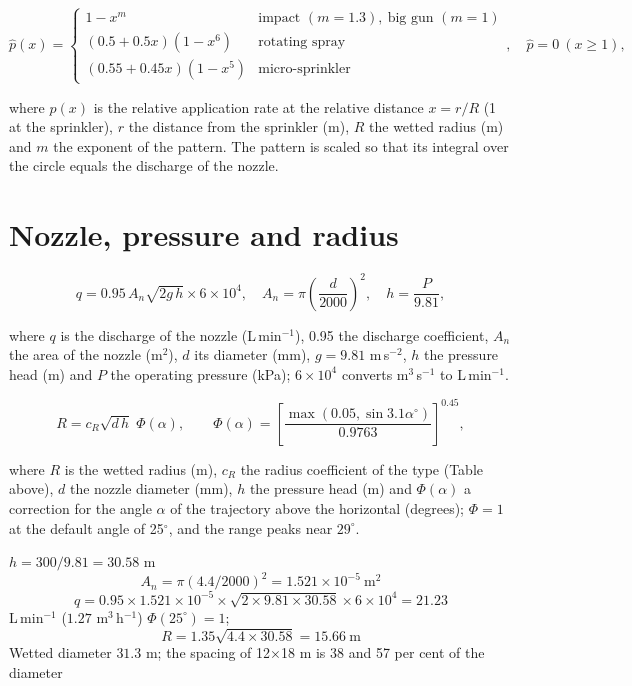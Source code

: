 \begin{equation}\hat p(x)=\begin{cases}1-x^{m}&\text{impact }(m=1.3),\ \text{big gun }(m=1)\\ (0.5+0.5x)(1-x^{6})&\text{rotating spray}\\ (0.55+0.45x)(1-x^{5})&\text{micro-sprinkler}\end{cases},\quad \hat p=0\ (x\ge1),\label{eq:p-pat}\end{equation}
\par\noindent where $\hat p(x)$ is the relative application rate at the relative distance $x=r/R$ (1 at the sprinkler), $r$ the distance from the sprinkler (m), $R$ the wetted radius (m) and $m$ the exponent of the pattern. The pattern is scaled so that its integral over the circle equals the discharge of the nozzle.

\section{Nozzle, pressure and radius}
\begin{equation}\boxed{q=0.95\,A_n\sqrt{2g\,h}\times6\times10^{4},\quad A_n=\pi\left(\frac{d}{2000}\right)^{2},\quad h=\frac{P}{9.81},}\label{eq:p-q}\end{equation}
\par\noindent where $q$ is the discharge of the nozzle (L\,min$^{-1}$), 0.95 the discharge coefficient, $A_n$ the area of the nozzle (m$^2$), $d$ its diameter (mm), $g=9.81$ m\,s$^{-2}$, $h$ the pressure head (m) and $P$ the operating pressure (kPa); $6\times10^{4}$ converts m$^3$\,s$^{-1}$ to L\,min$^{-1}$.

\begin{equation}\boxed{R=c_R\sqrt{d\,h}\;\Phi(\alpha),\qquad\Phi(\alpha)=\left[\frac{\max(0.05,\sin3.1\alpha^{\circ})}{0.9763}\right]^{0.45},}\label{eq:p-R}\end{equation}
\par\noindent where $R$ is the wetted radius (m), $c_R$ the radius coefficient of the type (Table above), $d$ the nozzle diameter (mm), $h$ the pressure head (m) and $\Phi(\alpha)$ a correction for the angle $\alpha$ of the trajectory above the horizontal (degrees); $\Phi=1$ at the default angle of 25$^\circ$, and the range peaks near $29^\circ$.

\sol $h=300/9.81=30.58$ m \ans \[A_n=\pi(4.4/2000)^2=1.521\times10^{-5}\ \text{m$^2$}\] \ans \[q=0.95\times1.521\times10^{-5}\times\sqrt{2\times9.81\times30.58}\times6\times10^4=21.23\] L\,min$^{-1}$ ($1.27$ m$^3$\,h$^{-1}$) \ans $\Phi(25^\circ)=1$; \[R=1.35\sqrt{4.4\times30.58}=15.66\ \text{m}\] \ans Wetted diameter $31.3$ m; the spacing of 12$\times$18 m is 38 and 57 per cent of the diameter \finans

